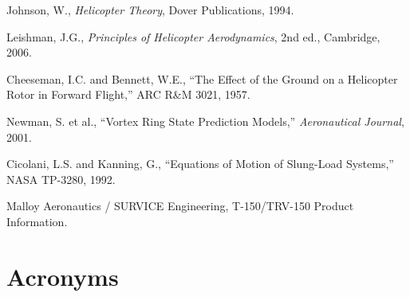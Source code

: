 \documentclass[11pt, letterpaper]{article}
\begin{document}
\unclass [6] Johnson, W., \textit{Helicopter Theory}, Dover Publications, 1994.

\unclass [7] Leishman, J.G., \textit{Principles of Helicopter Aerodynamics}, 2nd ed., Cambridge, 2006.

\unclass [8] Cheeseman, I.C. and Bennett, W.E., ``The Effect of the Ground on a Helicopter Rotor in Forward Flight,'' ARC R\&M 3021, 1957.

\unclass [9] Newman, S. et al., ``Vortex Ring State Prediction Models,'' \textit{Aeronautical Journal}, 2001.

\unclass [10] Cicolani, L.S. and Kanning, G., ``Equations of Motion of Slung-Load Systems,'' NASA TP-3280, 1992.

\unclass [11] Malloy Aeronautics / SURVICE Engineering, T-150/TRV-150 Product Information.

\pagebreak

\section{\unclass Acronyms}
\end{document}
